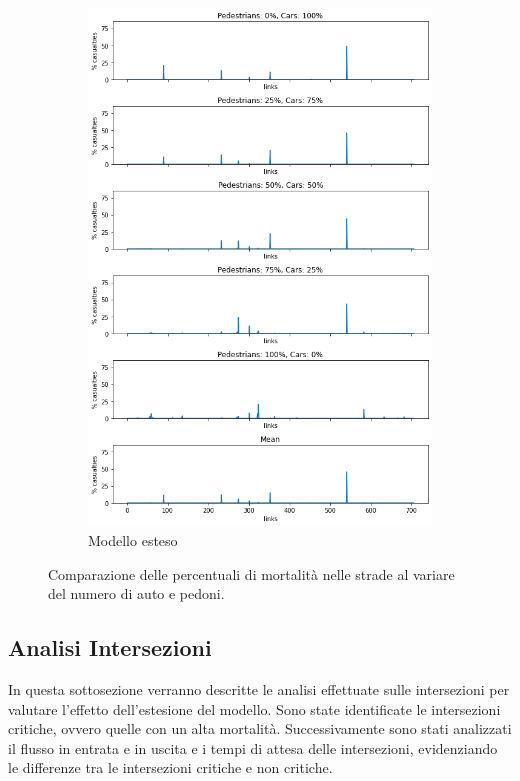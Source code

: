 \begin{figure}[ht]
\begin{subfigure}{0.475\textwidth}
        \includegraphics[width=\textwidth]{images/analisi/new_links_casualties}
        \caption{Modello esteso}
        \label{fig:new-link-casualties}
    \end{subfigure}
    \caption{Comparazione delle percentuali di mortalità nelle strade al variare del numero di auto e pedoni.}
    \label{fig:analisi-comparison-critical-links1}
\end{figure}


\newpage

\subsection{Analisi Intersezioni}
In questa sottosezione verranno descritte le analisi effettuate sulle intersezioni per valutare l'effetto dell'estesione 
del modello. Sono state identificate le intersezioni critiche, ovvero quelle con un alta mortalità. Successivamente 
sono stati analizzati il flusso in entrata e in uscita e i tempi di attesa delle intersezioni, evidenziando le differenze tra le 
intersezioni critiche e non critiche.

